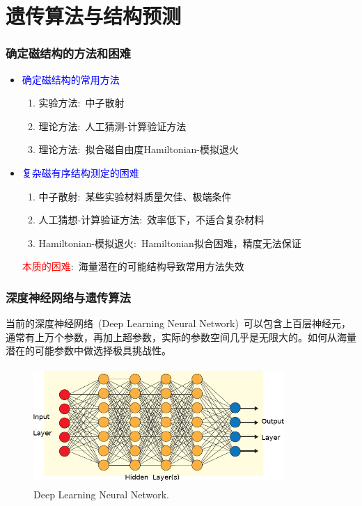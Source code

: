 \documentclass[cjk,slidestop,compress,mathserif,blue]{beamer}
\begin{document}
\section{遗传算法与结构预测}
\frame
{
	\frametitle{确定磁结构的方法和困难}
	\begin{itemize}
                \setlength{\itemsep}{5pt}
		\item \textcolor{blue}{确定磁结构的常用方法}
			\begin{enumerate}
                                \setlength{\itemsep}{3pt}
				\item 实验方法:~中子散射
				\item 理论方法:~人工猜测-计算验证方法
				\item 理论方法:~拟合磁自由度\textrm{Hamiltonian}-模拟退火
			\end{enumerate}
		\item \textcolor{blue}{复杂磁有序结构测定的困难}
			\begin{enumerate}
                                \setlength{\itemsep}{3pt}
				\item 中子散射:~某些实验材料质量欠佳、极端条件
				\item 人工猜想-计算验证方法:~效率低下，不适合复杂材料
				\item \textrm{Hamiltonian}-模拟退火:~\textrm{Hamiltonian}拟合困难，精度无法保证
			\end{enumerate}
			\textcolor{red}{本质的困难}:~海量潜在的可能结构导致常用方法失效
	\end{itemize}
}

\frame
{
	\frametitle{深度神经网络与遗传算法}
当前的深度神经网络~\textrm{(Deep Learning Neural Network)}~可以包含上百层神经元，通常有上万个参数，再加上超参数，实际的参数空间几乎是无限大的。如何从海量潜在的可能参数中做选择极具挑战性。
\begin{figure}[h!]
\vspace*{-0.08in}
\centering
\includegraphics[height=1.75in,width=3.75in]{Figures/ANN_Algorithm.png}
\caption{\tiny \textrm{Deep Learning Neural Network.}}%
\label{Fig:Deep-Learning-NN}
\end{figure}
}
\end{document}
